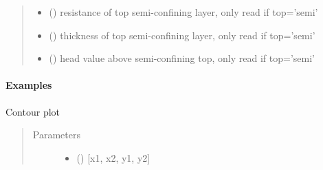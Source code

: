 \documentclass[letterpaper,10pt,english]{sphinxmanual}
\begin{document}
\begin{fulllineitems}
\begin{quote}
\begin{description}
\begin{itemize}
\item {} 
 () \textendash{} resistance of top semi-confining layer, only read if top=’semi’

\item {} 
 () \textendash{} thickness of top semi-confining layer, only read if top=’semi’

\item {} 
 (\sphinxstyleliteralemphasis{ (}\sphinxstyleliteralemphasis{)}) \textendash{} head value above semi-confining top, only read if top=’semi’

\end{itemize}

\end{description}\end{quote}
\paragraph{Examples}

\begin{sphinxVerbatim}[commandchars=\\\{\}]
      
\end{sphinxVerbatim}

\begin{fulllineitems}
\label{\detokenize{models/model3d:timml.model.Model3D.contour}}
Contour plot
\begin{quote}\begin{description}
\item[{Parameters}] \leavevmode\begin{itemize}
\item {} 
 () \textendash{} {[}x1, x2, y1, y2{]}


\end{itemize}
\end{description}
\end{quote}
\end{fulllineitems}
\end{fulllineitems}
\end{document}
